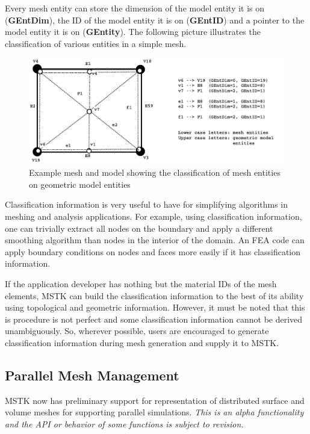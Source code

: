\documentclass[12pt]{article}
\begin{document}
Every mesh entity can store the dimension of the model entity it is on
({\bf GEntDim}), the ID of the model entity it is on ({\bf GEntID})
and a pointer to the model entity it is on ({\bf GEntity}). The
following picture illustrates the classification of various entities
in a simple mesh.

\begin{figure}
  \begin{center}
    \includegraphics[width=\textwidth]{figures/classfn}
  \end{center}
  \caption{Example mesh and model showing the classification of mesh entities on geometric model entities}
\end{figure}

Classification information is very useful to have for simplifying
algorithms in meshing and analysis applications. For example, using
classification information, one can trivially extract all nodes on the
boundary and apply a different smoothing algorithm than nodes in the
interior of the domain. An FEA code can apply boundary conditions on
nodes and faces more easily if it has classification information.

If the application developer has nothing but the material IDs of the
mesh elements, MSTK can build the classification information to the
best of its ability using topological and geometric
information. However, it must be noted that this is procedure is not
perfect and some classification information cannot be derived
unambiguously. So, wherever possible, users are encouraged to generate
classification information during mesh generation and supply it to
MSTK.

\subsection{Parallel Mesh Management}

MSTK now has preliminary support for representation of distributed
surface and volume meshes for supporting parallel
simulations. \textit{This is an alpha functionality and the API or
  behavior of some functions is subject to revision.}
\end{document}
